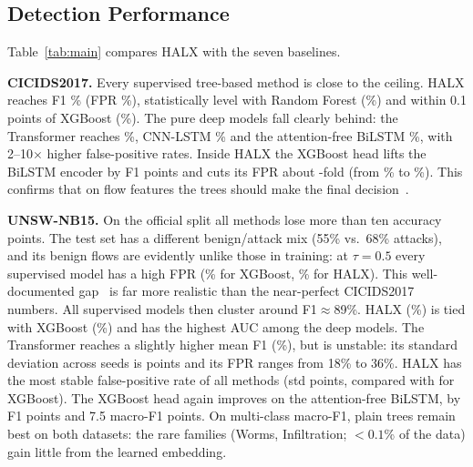 
\begin{table}[t]
\caption{Binary detection (attack vs.\ benign, $\tau=0.5$) and multi-class macro-F1 (M-F1) on the test
sets, mean{\tiny$\pm$std} over 3 seeds, in \%. Best mean per column and dataset in bold.
All methods receive identical privatized inputs ($k=10$, $\varepsilon=1$).}
\label{tab:main}
\centering
\footnotesize
\setlength{\tabcolsep}{4.2pt}

\end{table}

\subsection{Detection Performance}
Table~\ref{tab:main} compares HALX with the seven baselines.

\textbf{CICIDS2017.} Every supervised tree-based method is close to the
ceiling. HALX reaches F1 \cicHALXfOne\% (FPR \cicHALXfpr\%), statistically
level with Random Forest (\cicRFfOne\%) and within 0.1 points of
XGBoost (\cicXGBoostfOne\%). The pure deep models fall clearly behind:
the Transformer reaches \cicTransformerfOne\%, CNN-LSTM \cicCNNLSTMfOne\% and the attention-free
BiLSTM \cicLSTMfOne\%, with 2--10$\times$ higher false-positive rates. Inside
HALX the XGBoost head lifts the BiLSTM encoder by \cicgapfOne{} F1 points
and cuts its FPR about \cicfprratio-fold (from \cicLSTMfpr\% to \cicHALXfpr\%). This
confirms that on flow features the trees should make the final
decision~\cite{grinsztajn2022tree}.

\textbf{UNSW-NB15.} On the official split all methods lose more than ten
accuracy points. The test set has a different benign/attack mix (55\%
vs.\ 68\% attacks), and its benign flows are evidently unlike those in
training: at $\tau=0.5$ every supervised model has a high FPR
(\unswXGBoostfpr\% for XGBoost, \unswHALXfpr\% for HALX). This
well-documented gap~\cite{catillo2022transferability,engelen2021troubleshooting}
is far more realistic than the near-perfect CICIDS2017 numbers. All
supervised models then cluster around F1${}\approx{}$89\%. HALX
(\unswHALXfOne{\tiny$\pm$\unswHALXfOnesd}\%) is tied with XGBoost
(\unswXGBoostfOne{\tiny$\pm$\unswXGBoostfOnesd}\%) and has the highest AUC
among the deep models. The Transformer reaches a slightly higher mean F1
(\unswTransformerfOne\%), but is unstable: its standard deviation across
seeds is \unswTransformerfOnesd{} points and its FPR ranges from 18\% to
36\%. HALX has the most stable false-positive rate of all methods
(std \unswHALXfprsd{} points, compared with \unswXGBoostfprsd{} for XGBoost). The
XGBoost head again improves on the attention-free BiLSTM, by
\unswgapfOne{} F1 points and 7.5 macro-F1 points. On multi-class
macro-F1, plain trees remain best on both datasets: the rare families
(Worms, Infiltration; ${<}0.1$\% of the data) gain little from the
learned embedding.

